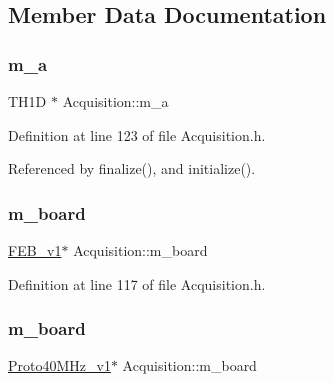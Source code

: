 \subsection{Member Data Documentation}
\mbox{\label{classAcquisition_aedfd2a4842b08fdf85176bf672030430}} 
\subsubsection{\texorpdfstring{m\+\_\+a}{m\_a}}
{\footnotesize\ttfamily T\+H1D $\ast$ Acquisition\+::m\+\_\+a\hspace{0.3cm}{\ttfamily [private]}}



Definition at line 123 of file Acquisition.\+h.



Referenced by finalize(), and initialize().

\mbox{\label{classAcquisition_ad4820003ddd62f0ca886c2e6a3690120}} 
\subsubsection{\texorpdfstring{m\+\_\+board}{m\_board}\hspace{0.1cm}{\footnotesize\ttfamily [1/2]}}
{\footnotesize\ttfamily \hyperlink{classFEB__v1}{F\+E\+B\+\_\+v1}$\ast$ Acquisition\+::m\+\_\+board\hspace{0.3cm}{\ttfamily [private]}}



Definition at line 117 of file Acquisition.\+h.

\mbox{\label{classAcquisition_a9b0db99be79d61ae78dae8a9e4efceab}} 
\subsubsection{\texorpdfstring{m\+\_\+board}{m\_board}\hspace{0.1cm}{\footnotesize\ttfamily [2/2]}}
{\footnotesize\ttfamily \hyperlink{classProto40MHz__v1}{Proto40\+M\+Hz\+\_\+v1}$\ast$ Acquisition\+::m\+\_\+board\hspace{0.3cm}{\ttfamily [private]}}



